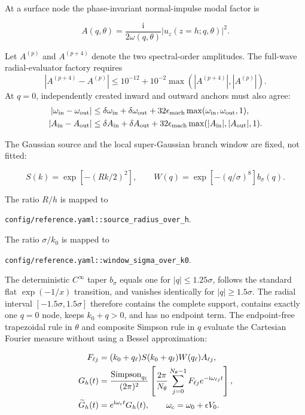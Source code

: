 At a surface node the phase-invariant normal-impulse modal factor is

\[
 A(q,\theta)=\frac{\mathrm i}{2\omega(q,\theta)}
 \left|u_z(z=h;q,\theta)\right|^2 .
\]

Let \(A^{(p)}\) and \(A^{(p+4)}\) denote the two spectral-order amplitudes.
The full-wave radial-evaluator factory requires
\[
 |A^{(p+4)}-A^{(p)}|
 \leq10^{-12}+10^{-2}\max(|A^{(p+4)}|,|A^{(p)}|).
\]
At \(q=0\), independently created inward and outward anchors must also agree:
\[
 \begin{aligned}
 |\omega_{\rm in}-\omega_{\rm out}|
 &\leq\delta\omega_{\rm in}+\delta\omega_{\rm out}
 +32\epsilon_{\rm mach}\max(\omega_{\rm in},\omega_{\rm out},1),\\
 |A_{\rm in}-A_{\rm out}|
 &\leq\delta A_{\rm in}+\delta A_{\rm out}
 +32\epsilon_{\rm mach}\max(|A_{\rm in}|,|A_{\rm out}|,1).
 \end{aligned}
\]

The Gaussian source and the local super-Gaussian branch window are fixed,
not fitted:

\[
 S(k)=\exp[-(Rk/2)^2],\qquad
 W(q)=\exp[-(q/\sigma)^8]b_\sigma(q).
\]

The ratio \(R/h\) is mapped to
\begin{center}
\texttt{config/reference.yaml::source\_radius\_over\_h}.
\end{center}
The ratio \(\sigma/k_0\) is mapped to
\begin{center}
\texttt{config/reference.yaml::window\_sigma\_over\_k0}.
\end{center}

The deterministic \(C^\infty\) taper \(b_\sigma\) equals one for
\(|q|\leq1.25\sigma\), follows the standard flat \(\exp(-1/x)\) transition,
and vanishes identically for \(|q|\geq1.5\sigma\).  The radial interval
\([-1.5\sigma,1.5\sigma]\) therefore contains the complete support, contains
exactly one \(q=0\) node, keeps \(k_0+q>0\), and has no endpoint term.  The
endpoint-free trapezoidal rule in
\(\theta\) and composite Simpson rule in \(q\) evaluate the Cartesian
Fourier measure without using a Bessel approximation:

\begin{equation}
 \begin{aligned}
 F_{\ell j}&=(k_0+q_\ell)S(k_0+q_\ell)W(q_\ell)A_{\ell j},\\
 G_h(t)&=\frac{\operatorname{Simpson}_{q_\ell}}{(2\pi)^2}
 \left[\frac{2\pi}{N_\theta}
 \sum_{j=0}^{N_\theta-1}F_{\ell j}
 e^{-\mathrm i\omega_{\ell j}t}\right],\\
 \widetilde G_h(t)&=e^{\mathrm i\omega_{\rm c}t}G_h(t),
 \qquad \omega_{\rm c}=\omega_0+\epsilon V_0 .
 \end{aligned}
 \label{eq:polar-green-quadrature}
\end{equation}


